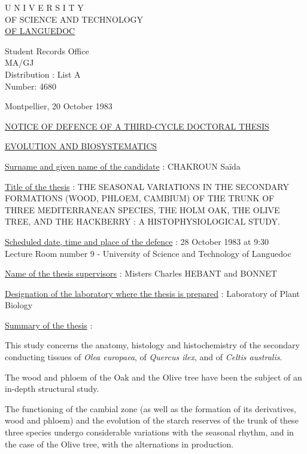 
\begin{center}
U N I V E R S I T Y\\
OF SCIENCE AND TECHNOLOGY\\
\uline{OF LANGUEDOC}

Student Records Office\\
MA/GJ\\
Distribution : List A\\
Number: 4680
\end{center}

Montpellier, 20 October 1983

\begin{center}
\uline{NOTICE OF DEFENCE OF A THIRD-CYCLE DOCTORAL THESIS}

\uline{EVOLUTION AND BIOSYSTEMATICS}
\end{center}

\uline{Surname and given name of the candidate} : CHAKROUN Saïda

\uline{Title of the thesis} : THE SEASONAL VARIATIONS IN THE SECONDARY FORMATIONS (WOOD, PHLOEM, CAMBIUM) OF THE TRUNK OF THREE MEDITERRANEAN SPECIES, THE HOLM OAK, THE OLIVE TREE, AND THE HACKBERRY : A HISTOPHYSIOLOGICAL STUDY.

\uline{Scheduled date, time and place of the defence} : 28 October 1983 at 9:30\\
Lecture Room number 9 - University of Science and Technology of Languedoc

\uline{Name of the thesis supervisors} : Misters Charles HEBANT and BONNET

\uline{Designation of the laboratory where the thesis is prepared} : Laboratory of Plant Biology

\uline{Summary of the thesis} :

This study concerns the anatomy, histology and histochemistry of the secondary conducting tissues of \textit{Olea europaea}, of \textit{Quercus ilex}, and of \textit{Celtis australis}.

The wood and phloem of the Oak and the Olive tree have been the subject of an in-depth structural study.

The functioning of the cambial zone (as well as the formation of its derivatives, wood and phloem) and the evolution of the starch reserves of the trunk of these three species undergo considerable variations with the seasonal rhythm, and in the case of the Olive tree, with the alternations in production.

